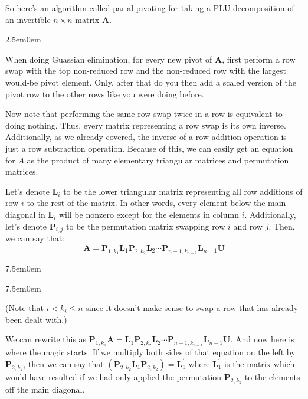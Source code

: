 \documentclass{book}
\newcommand{\hTwo}{%
   \color{MidnightBlue}%
   \fontsize{13}{15}\selectfont%
}
\newcommand{\hFour}{%
   \color{Cerulean}
   \fontsize{12}{14}\selectfont%
}
\newenvironment{myIndent}{%
   \begin{adjustwidth}{2.5em}{0em}%
}{%
   \end{adjustwidth}%
}
\newenvironment{myTindent}{%
   \begin{adjustwidth}{7.5em}{0em}%
}{%
   \end{adjustwidth}%
}
\newcommand{\udefine}[1]{%
   {\setulcolor{Red}%
   \setul{0.14em}{0.07em}%
   \ul{#1}}%
}
\newcommand{\retTwo}{\hfill\bigbreak}
\newcommand{\mMat}[1]{\mathbf{#1}}
\begin{document}
   So here's an algorithm called \udefine{parial pivoting} for taking a \udefine{PLU decomposition} of an invertible $n\times n$ matrix $\mMat{A}$.
   
   \hTwo
   \begin{myIndent}
      When doing Guassian elimination, for every new pivot of $\mMat{A}$, first perform a row swap with the top non-reduced row and the non-reduced row with the largest would-be pivot element. Only, after that do you then add a scaled version of the pivot row to the other rows like you were doing before. \retTwo

      Now note that performing the same row swap twice in a row is equivalent to doing nothing. Thus, every matrix representing a row swap is its own inverse. \\ Additionally, as we already covered, the inverse of a row addition operation is just a row subtraction operation. Because of this, we can easily get an equation for $A$ as the product of many elementary triangular matrices and permutation matrices. \retTwo

      Let's denote $\mMat{L}_i$ to be the lower triangular matrix representing all row additions of row $i$ to the rest of the matrix. In other words, every element below the main \\diagonal in $\mMat{L}_i$ will be nonzero except for the elements in column $i$. Additionally, let's denote $\mMat{P}_{i, j}$ to be the permutation matrix swapping row $i$ and row $j$. Then, we can say that:
      \[\mMat{A} = \mMat{P}_{1, k_{1}}\mMat{L}_{1}\mMat{P}_{2, k_{2}}\mMat{L}_{2}\cdots\mMat{P}_{n-1, k_{n-1}}\mMat{L}_{n-1}\mMat{U}\]
      {\begin{myTindent}\begin{myTindent} \hFour
         (Note that $i < k_i \leq n$ since it doesn't make sense to swap a row that has already been dealt with.) \retTwo
      \end{myTindent}\end{myTindent}}

      We can rewrite this as $\mMat{P}_{1, k_{1}}\mMat{A} = \mMat{L}_{1}\mMat{P}_{2, k_{2}}\mMat{L}_{2}\cdots\mMat{P}_{n-1, k_{n-1}}\mMat{L}_{n-1}\mMat{U}$. And now here is where the magic starts. If we multiply both sides of that equation on the left by $\mMat{P}_{2, k_{2}}$, then we can say that $(\mMat{P}_{2, k_{2}}\mMat{L}_{1}\mMat{P}_{2, k_{2}})=\mMat{L}^\prime_{1}$ where $\mMat{L}^\prime_{1}$ is the matrix which would have resulted if we had only applied the permutation $\mMat{P}_{2, k_{2}}$ to the elements off the main diagonal.
      \newpage


\end{myIndent}
\end{document}
